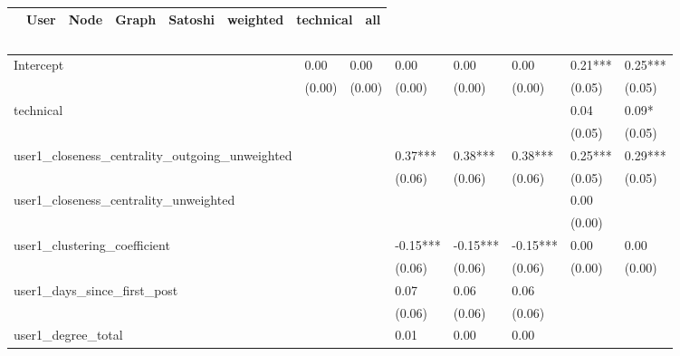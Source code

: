 \begin{table}
\caption{}
\begin{center}
\begin{tabular}{lccccccc}
\hline
                                               &   User  &   Node  &  Graph   & Satoshi  & weighted & technical &   all    \\
\hline
\hline
\end{tabular}
\begin{tabular}{llllllll}
Intercept                                      & 0.00    & 0.00    & 0.00     & 0.00     & 0.00     & 0.21***   & 0.25***  \\
                                               & (0.00)  & (0.00)  & (0.00)   & (0.00)   & (0.00)   & (0.05)    & (0.05)   \\
technical                                      &         &         &          &          &          & 0.04      & 0.09*    \\
                                               &         &         &          &          &          & (0.05)    & (0.05)   \\
user1_closeness_centrality_outgoing_unweighted &         &         & 0.37***  & 0.38***  & 0.38***  & 0.25***   & 0.29***  \\
                                               &         &         & (0.06)   & (0.06)   & (0.06)   & (0.05)    & (0.05)   \\
user1_closeness_centrality_unweighted          &         &         &          &          &          & 0.00      &          \\
                                               &         &         &          &          &          & (0.00)    &          \\
user1_clustering_coefficient                   &         &         & -0.15*** & -0.15*** & -0.15*** & 0.00      & 0.00     \\
                                               &         &         & (0.06)   & (0.06)   & (0.06)   & (0.00)    & (0.00)   \\
user1_days_since_first_post                    &         &         & 0.07     & 0.06     & 0.06     &           &          \\
                                               &         &         & (0.06)   & (0.06)   & (0.06)   &           &          \\
user1_degree_total                             &         &         & 0.01     & 0.00     & 0.00     &           &          \\

\end{tabular}
\end{center}
\end{table}
